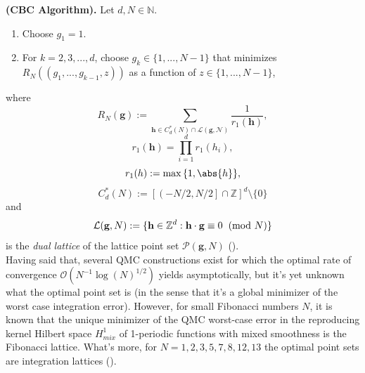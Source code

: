 \begin{Algorithm} \label{CBC}
     \textbf{(CBC Algorithm).} Let $d,N \in \mathbb{N}$.
     \begin{enumerate}
         \item Choose $g_1 = 1$.
         \item For $k=2,3,...,d$, choose $g_k \in \{ 1,...,N-1 \}$ that minimizes $R_N((g_1,...,g_{k-1},z))$ as a function of $z \in \{ 1,...,N-1 \}$, 
     \end{enumerate}
\end{Algorithm}
where
\begin{equation*}
    R_N(\textbf{g}) := \sum_{\textbf{h}\in C_d^*(N)\cap \mathcal{L(\textbf{g},N)}} \frac{1}{r_1(\textbf{h})},
\end{equation*}
\begin{equation*}
    r_1(\textbf{h}) = \prod_{i=1}^d r_1(h_i),
\end{equation*}
\begin{equation*}
    r_1(h) := \max{\{1,\abs{h}\}},
\end{equation*}
\begin{equation*}
    C_d^*(N) := \left[ \left( -N/2,N/2 \right] \cap \mathbb{Z} \right]^d\setminus\{0\}
\end{equation*}
and
\begin{equation*}
    \mathcal{L}(\textbf{g},N) := \{ \textbf{h} \in \mathbb{Z}^d : \textbf{h} \cdot \textbf{g} \equiv 0 \hspace{2mm} (\text{mod } N) \}
\end{equation*}
is the \textit{dual lattice} of the lattice point set $\mathcal{P}(\textbf{g},N)$ (\cite{Leobacher_Pillichshammer___2013___Introduction_to_Quasi_Montecarlo_Methods.pdf}).\\

Having said that, several QMC constructions exist for which the optimal rate of convergence $\mathcal{O}(N^{-1}\log(N)^{1/2})$ yields asymptotically, but it's yet unknown what the optimal point set is (in the sense that it's a global minimizer of the worst case integration error). However, for small Fibonacci numbers $N$, it is known that the unique minimizer of the QMC worst-case error in the reproducing kernel Hilbert space $H_{mix}^1$ of 1-periodic functions with mixed smoothness is the Fibonacci lattice. What's more, for $N=1,2,3,5,7,8,12,13$ the optimal point sets are integration lattices (\cite{Hinrichs.pdf}).\\




